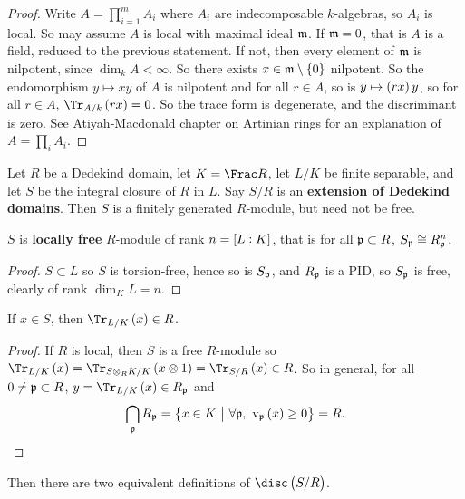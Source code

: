 \begin{proof}
Write $ A = \prod_{i = 1}^m A_i $ where $ A_i $ are indecomposable $ k $-algebras, so $ A_i $ is local. So may assume $ A $ is local with maximal ideal $ \mathfrak{m} $. If $ \mathfrak{m} = 0 $, that is $ A $ is a field, reduced to the previous statement. If not, then every element of $ \mathfrak{m} $ is nilpotent, since $ \dim_k A < \infty $. So there exists $ x \in \mmm \setminus \cbr{0} $ nilpotent. So the endomorphism $ y \mapsto xy $ of $ A $ is nilpotent and for all $ r \in A $, so is $ y \mapsto \br{rx}y $, so for all $ r \in A $, $ \Tr_{A / k}\br{rx} = 0 $. So the trace form is degenerate, and the discriminant is zero. See Atiyah-Macdonald chapter on Artinian rings for an explanation of $ A = \prod_i A_i $.
\end{proof}


Let $ R $ be a Dedekind domain, let $ K = \Frac R $, let $ L / K $ be finite separable, and let $ S $ be the integral closure of $ R $ in $ L $. Say $ S / R $ is an \textbf{extension of Dedekind domains}. Then $ S $ is a finitely generated $ R $-module, but need not be free.

\begin{proposition}
$ S $ is \textbf{locally free} $ R $-module of rank $ n = \sbr{L : K} $, that is for all $ \mathfrak{p} \subset R $, $ S_{\mathfrak{p}} \cong R_{\mathfrak{p}}^n $.
\end{proposition}

\begin{proof}
$ S \subset L $ so $ S $ is torsion-free, hence so is $ S_{\mathfrak{p}} $, and $ R_{\mathfrak{p}} $ is a PID, so $ S_{\mathfrak{p}} $ is free, clearly of rank $ \dim_K L = n $.
\end{proof}

\pagebreak

\begin{lemma}
If $ x \in S $, then $ \Tr_{L / K}\br{x} \in R $.
\end{lemma}

\begin{proof}
If $ R $ is local, then $ S $ is a free $ R $-module so $ \Tr_{L / K}\br{x} = \Tr_{S \otimes_R K / K}\br{x \otimes 1} = \Tr_{S / R}\br{x} \in R $. So in general, for all $ 0 \ne \mathfrak{p} \subset R $, $ y = \Tr_{L / K}\br{x} \in R_\ppp $ and
$$ \bigcap_\ppp R_\ppp = \cbr{x \in K \st \forall \ppp, \ \v_\ppp\br{x} \ge 0} = R. $$
\end{proof}

Then there are two equivalent definitions of $ \disc\br{S / R} $.

